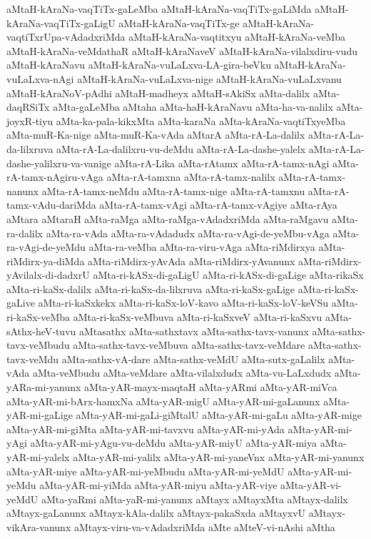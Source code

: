 {aMtaH-kAraNa-vaqTiTx-gaLeMba
aMtaH-kAraNa-vaqTiTx-gaLiMda
aMtaH-kAraNa-vaqTiTx-gaLigU
aMtaH-kAraNa-vaqTiTx-ge
aMtaH-kAraNa-vaqtiTxrUpa-vAdadxriMda
aMtaH-kAraNa-vaqtitxyu
aMtaH-kAraNa-veMba
aMtaH-kAraNa-veMdathaR
aMtaH-kAraNaveV
aMtaH-kAraNa-vilalxdiru-vudu
aMtaH-kAraNavu
aMtaH-kAraNa-vuLaLxva-LA-gira-beVku
aMtaH-kAraNa-vuLaLxva-nAgi
aMtaH-kAraNa-vuLaLxva-nige
aMtaH-kAraNa-vuLaLxvanu
aMtaH-kAraNoV-pAdhi
aMtaH-madheyx
aMtaH-sAkiSx
aMta-dalilx
aMta-daqRSiTx
aMta-gaLeMba
aMtaha
aMta-haH-kAraNavu
aMta-ha-va-nalilx
aMta-joyxR-tiyu
aMta-ka-pala-kikxMta
aMta-karaNa
aMta-kAraNa-vaqtiTxyeMba
aMta-muR-Ka-nige
aMta-muR-Ka-vAda
aMtarA
aMta-rA-La-dalilx
aMta-rA-La-da-lilxruva
aMta-rA-La-dalilxru-vu-deMdu
aMta-rA-La-dashe-yalelx
aMta-rA-La-dashe-yalilxru-va-vanige
aMta-rA-Lika
aMta-rAtamx
aMta-rA-tamx-nAgi
aMta-rA-tamx-nAgiru-vAga
aMta-rA-tamxna
aMta-rA-tamx-nalilx
aMta-rA-tamx-nanunx
aMta-rA-tamx-neMdu
aMta-rA-tamx-nige
aMta-rA-tamxnu
aMta-rA-tamx-vAdu-dariMda
aMta-rA-tamx-vAgi
aMta-rA-tamx-vAgiye
aMta-rAya
aMtara
aMtaraH
aMta-raMga
aMta-raMga-vAdadxriMda
aMta-raMgavu
aMta-ra-dalilx
aMta-ra-vAda
aMta-ra-vAdadudx
aMta-ra-vAgi-de-yeMbu-vAga
aMta-ra-vAgi-de-yeMdu
aMta-ra-veMba
aMta-ra-viru-vAga
aMta-riMdirxya
aMta-riMdirx-ya-diMda
aMta-riMdirx-yAvAda
aMta-riMdirx-yAvanunx
aMta-riMdirx-yAvilalx-di-dadxrU
aMta-ri-kASx-di-gaLigU
aMta-ri-kASx-di-gaLige
aMta-rikaSx
aMta-ri-kaSx-dalilx
aMta-ri-kaSx-da-lilxruva
aMta-ri-kaSx-gaLige
aMta-ri-kaSx-gaLive
aMta-ri-kaSxkekx
aMta-ri-kaSx-loV-kavo
aMta-ri-kaSx-loV-keVSu
aMta-ri-kaSx-veMba
aMta-ri-kaSx-veMbuva
aMta-ri-kaSxveV
aMta-ri-kaSxvu
aMta-sAthx-heV-tuvu
aMtasathx
aMta-sathxtavx
aMta-sathx-tavx-vanunx
aMta-sathx-tavx-veMbudu
aMta-sathx-tavx-veMbuva
aMta-sathx-tavx-veMdare
aMta-sathx-tavx-veMdu
aMta-sathx-vA-dare
aMta-sathx-veMdU
aMta-sutx-gaLalilx
aMta-vAda
aMta-veMbudu
aMta-veMdare
aMta-vilalxdudx
aMta-vu-LaLxdudx
aMta-yARa-mi-yanunx
aMta-yAR-mayx-maqtaH
aMta-yARmi
aMta-yAR-miVca
aMta-yAR-mi-bArx-hamxNa
aMta-yAR-migU
aMta-yAR-mi-gaLanunx
aMta-yAR-mi-gaLige
aMta-yAR-mi-gaLi-giMtalU
aMta-yAR-mi-gaLu
aMta-yAR-mige
aMta-yAR-mi-giMta
aMta-yAR-mi-tavxvu
aMta-yAR-mi-yAda
aMta-yAR-mi-yAgi
aMta-yAR-mi-yAgu-vu-deMdu
aMta-yAR-miyU
aMta-yAR-miya
aMta-yAR-mi-yalelx
aMta-yAR-mi-yalilx
aMta-yAR-mi-yaneVnx
aMta-yAR-mi-yanunx
aMta-yAR-miye
aMta-yAR-mi-yeMbudu
aMta-yAR-mi-yeMdU
aMta-yAR-mi-yeMdu
aMta-yAR-mi-yiMda
aMta-yAR-miyu
aMta-yAR-viye
aMta-yAR-vi-yeMdU
aMta-yaRmi
aMta-yaR-mi-yanunx
aMtayx
aMtayxMta
aMtayx-dalilx
aMtayx-gaLanunx
aMtayx-kAla-dalilx
aMtayx-pakaSxda
aMtayxvU
aMtayx-vikAra-vanunx
aMtayx-viru-va-vAdadxriMda
aMte
aMteV-vi-nAshi
aMtha
}
